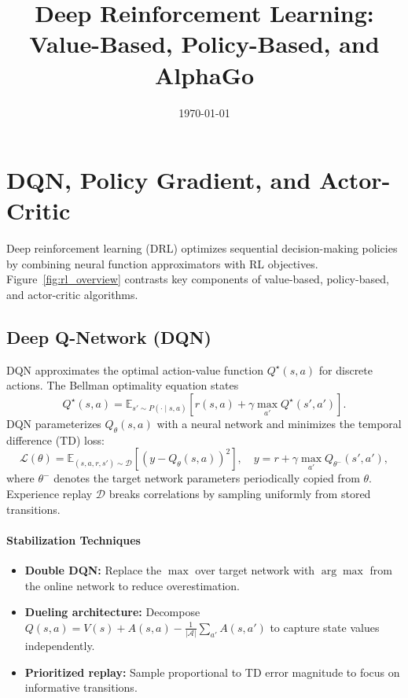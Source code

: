 \documentclass{article}
\title{Deep Reinforcement Learning: Value-Based, Policy-Based, and AlphaGo}
\author{}
\date{\today}
\begin{document}
\maketitle
\tableofcontents
\FloatBarrier

\section{DQN, Policy Gradient, and Actor-Critic}
Deep reinforcement learning (DRL) optimizes sequential decision-making policies by combining neural function approximators with RL objectives. Figure~\ref{fig:rl_overview} contrasts key components of value-based, policy-based, and actor-critic algorithms.

\subsection{Deep Q-Network (DQN)}
DQN approximates the optimal action-value function $Q^{\star}(s, a)$ for discrete actions. The Bellman optimality equation states
\begin{equation}
  Q^{\star}(s, a) = \mathbb{E}_{s' \sim P(\cdot \mid s, a)} \left[ r(s, a) + \gamma \max_{a'} Q^{\star}(s', a') \right].
\end{equation}
DQN parameterizes $Q_{\theta}(s, a)$ with a neural network and minimizes the temporal difference (TD) loss:
\begin{equation}
  \mathcal{L}(\theta) = \mathbb{E}_{(s, a, r, s') \sim \mathcal{D}} \left[ \left( y - Q_{\theta}(s, a) \right)^2 \right], \quad y = r + \gamma \max_{a'} Q_{\theta^{-}}(s', a'),
\end{equation}
where $\theta^{-}$ denotes the target network parameters periodically copied from $\theta$. Experience replay $\mathcal{D}$ breaks correlations by sampling uniformly from stored transitions.

\paragraph{Stabilization Techniques}
\begin{itemize}
  \item \textbf{Double DQN:} Replace the $\max$ over target network with $\arg\max$ from the online network to reduce overestimation.
  \item \textbf{Dueling architecture:} Decompose $Q(s, a) = V(s) + A(s, a) - \frac{1}{|\mathcal{A}|} \sum_{a'} A(s, a')$ to capture state values independently.
  \item \textbf{Prioritized replay:} Sample proportional to TD error magnitude to focus on informative transitions.
\end{itemize}
\end{document}
